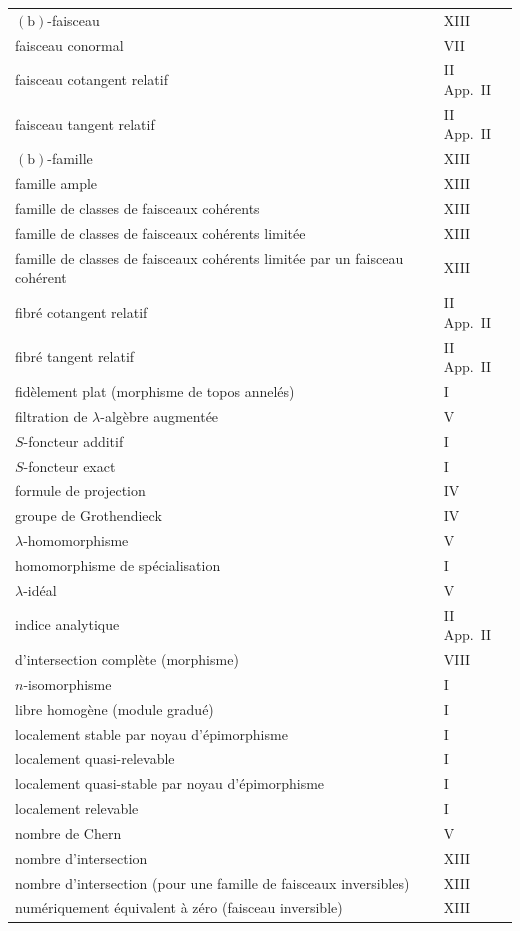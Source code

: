 \begin{longtable}{p{8cm}l}
$\mathrm{(b)}$-faisceau & XIII \\
faisceau conormal & VII \\
faisceau cotangent relatif & II App.\ II \\
faisceau tangent relatif & II App.\ II \\
$\mathrm{(b)}$-famille & XIII \\
famille ample & XIII \\
famille de classes de faisceaux coh\'erents & XIII \\
famille de classes de faisceaux coh\'erents limit\'ee & XIII \\
famille de classes de faisceaux coh\'erents limit\'ee par un faisceau coh\'erent & XIII \\
fibr\'e cotangent relatif & II App.\ II \\
fibr\'e tangent relatif & II App.\ II \\
fid\`element plat (morphisme de topos annel\'es) & I \\
filtration de $\lambda$-alg\`ebre augment\'ee & V \\
$S$-foncteur additif & I \\
$S$-foncteur exact & I \\
formule de projection & IV \\
groupe de Grothendieck & IV \\
$\lambda$-homomorphisme & V \\
homomorphisme de sp\'ecialisation & I \\
$\lambda$-id\'eal & V \\
indice analytique & II App.\ II \\
d'intersection compl\`ete (morphisme) & VIII \\
$n$-isomorphisme & I \\
libre homog\`ene (module gradu\'e) & I \\
localement stable par noyau d'\'epimorphisme & I \\
localement quasi-relevable & I \\
localement quasi-stable par noyau d'\'epimorphisme & I \\
localement relevable & I \\
nombre de Chern & V \\
nombre d'intersection & XIII \\
nombre d'intersection (pour une famille de faisceaux inversibles) & XIII \\
num\'eriquement \'equivalent \`a z\'ero (faisceau inversible) & XIII \\

\end{longtable}
